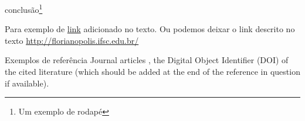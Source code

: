 \documentclass[a4paper, 12pt]{article}
\begin{document}
\cite{burns1961management}

conclusão\footnote{Um exemplo de rodapé}

Para exemplo de \href{www.google.com.br}{link} adicionado no texto. Ou podemos deixar o link descrito no texto \url{http://florianopolis.ifsc.edu.br/}

Exemplos de referência Journal articles \cite[cita a pagina 789]{batista2015embarcaccao}, the Digital
Object Identifier (DOI) of the cited literature (which should be added
at the end of the reference in question if available).

\end{document}
